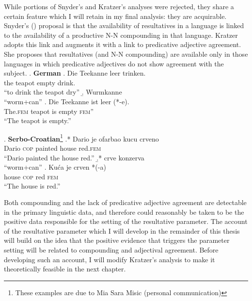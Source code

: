 \documentclass[MilwayThesis]{subfiles}
\begin{document}
While portions of Snyder's and Kratzer's analyses were rejected, they share a certain feature which I will retain in my final analysis: they are acquirable.
Snyder's (\citeyear{snyder1995language}) proposal is that the availability of resultatives in a language is linked to the availability of a productive N-N compounding in that language.
Kratzer adopts this link and augments it with a link to predicative adjective agreement.
She proposes that resultatives (and N-N compounding) are available only in those languages in which predicative adjectives do not show agreement with the subject.
\ex. \textbf{German}
\ag. Die Teekanne leer trinken.\\
the teapot empty drink.\\
``to drink the teapot dry'' \parencite{kratzer2004building}
\b. Wurmkanne\\
``worm+can'' \parencite{snyder2001nature}
\cg. Die Teekanne ist leer (*-e).\\
The.\textsc{fem} teapot is empty \textsc{fem}''\\
``The teapot is empty.''

\ex. \textbf{Serbo-Croatian}\footnote{These examples are due to Mia Sara Misic (personal communication)} 
\ag.* Dario je ofarbao kucu crveno\\
Dario \textsc{cop} painted house red.\textsc{fem}\\
``Dario painted the house red.''
\b.* crve konzerva\\
``worm+can''
\cg. Ku\'ca je crven *(-a)\\
house \textsc{cop} red \textsc{fem}\\
``The house is red.''

Both compounding and the lack of predicative adjective agreement are detectable in the primary linguistic data, and therefore could reasonably be taken to be the positive data responsible for the setting of the resultative parameter.
The account of the resultative parameter which I will develop in the remainder of this thesis will build on the idea that the positive evidence that triggers the parameter setting will be related to compounding and adjectival agreement.
Before developing such an account, I will modify Kratzer's analysis to make it theoretically feasible in the next chapter.
\end{document}
